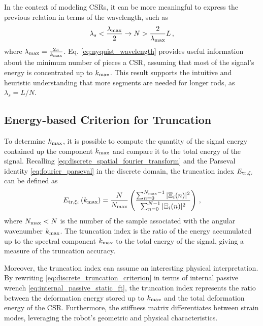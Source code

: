 In the context of modeling \acp{CSR}, it can be more meaningful to express the previous relation in terms of the wavelength, such as
\begin{equation} \label{eq:nyquist_wavelength}
    \lambda_{s} < \frac{\lambda_{\textnormal{max}}}{2} \rightarrow N > \frac{2}{\lambda_{\textnormal{max}}} L \, ,
\end{equation}
where $\lambda_{\textnormal{max}} = \frac{2 \pi}{k_{\textnormal{max}}}$. Eq. \eqref{eq:nyquist_wavelength} provides useful information about the minimum number of pieces a \ac{CSR}, assuming that most of the signal's energy is concentrated up to $k_{\textnormal{max}}$.
This result supports the intuitive and heuristic understanding that more segments are needed for longer rods, as $\lambda_s = L / N$.

\subsection{Energy-based Criterion for Truncation} \label{spatial_ft:truncation}
To determine $k_{\textnormal{max}}$, it is possible to compute the quantity of the signal energy contained up the component $k_{\textnormal{max}}$ and compare it to the total energy of the signal.
Recalling \eqref{eq:discrete_spatial_fourier_transform} and the Parseval identity \eqref{eq:fourier_parseval} in the discrete domain, the truncation index $E_{\textnormal{tr}, \xi_i}$ can be defined as
\begin{equation} \label{eq:discrete_truncation_criterion}
    E_{\textnormal{tr}, \xi_i}\left(k_{\textnormal{max}}\right) = \frac{N}{N_{\textnormal{max}}} \left(\frac{\sum_{n = 0}^{N_{\textnormal{max}} - 1} |\Xi_{i}(n)|^{2}}{\sum_{n = 0}^{N - 1} |\Xi_{i}(n)|^{2}}\right) \, ,
\end{equation}
where $N_{\textnormal{max}} < N$ is the number of the sample associated with the angular wavenumber $k_{\textnormal{max}}$. 
The truncation index is the ratio of the energy accumulated up to the spectral component $k_\textnormal{max}$ to the total energy of the signal, giving a measure of the truncation accuracy.

Moreover, the truncation index can assume an interesting physical interpretation. By rewriting \eqref{eq:discrete_truncation_criterion} in terms of internal passive wrench \eqref{eq:internal_passive_static_ft}, the truncation index represents the ratio between the deformation energy stored up to $k_{\textnormal{max}}$ and the total deformation energy of the \ac{CSR}. 
Furthermore, the stiffness matrix differentiates between strain modes, leveraging the robot's geometric and physical characteristics.

